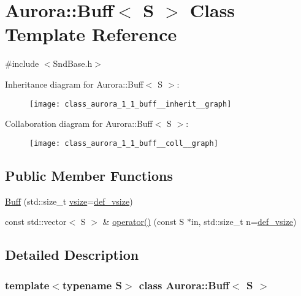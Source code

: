 \hypertarget{class_aurora_1_1_buff}{}\section{Aurora\+:\+:Buff$<$ S $>$ Class Template Reference}
\label{class_aurora_1_1_buff}


{\ttfamily \#include $<$Snd\+Base.\+h$>$}



Inheritance diagram for Aurora\+:\+:Buff$<$ S $>$\+:\nopagebreak
\begin{figure}[H]
\begin{center}
\leavevmode
\texttt{[image: class\_aurora\_1\_1\_buff\_\_inherit\_\_graph]}
\end{center}
\end{figure}


Collaboration diagram for Aurora\+:\+:Buff$<$ S $>$\+:\nopagebreak
\begin{figure}[H]
\begin{center}
\leavevmode
\texttt{[image: class\_aurora\_1\_1\_buff\_\_coll\_\_graph]}
\end{center}
\end{figure}
\subsection*{Public Member Functions}
\begin{DoxyCompactItemize}
\item 
\hyperlink{class_aurora_1_1_buff_aa6a1980c02f6f9e416bbc59905e847ad}{Buff} (std\+::size\+\_\+t \hyperlink{class_aurora_1_1_snd_base_af9e21aaf411b17f7a8221c991ce5d291}{vsize}=\hyperlink{namespace_aurora_afaaddf667a06e7ce23c667a8b7295263}{def\+\_\+vsize})
\item 
const std\+::vector$<$ S $>$ \& \hyperlink{class_aurora_1_1_buff_afd7878cb1948f8d41dfd635c163d1c27}{operator()} (const S $\ast$in, std\+::size\+\_\+t n=\hyperlink{namespace_aurora_afaaddf667a06e7ce23c667a8b7295263}{def\+\_\+vsize})
\end{DoxyCompactItemize}


\subsection{Detailed Description}
\subsubsection*{template$<$typename S$>$\newline
class Aurora\+::\+Buff$<$ S $>$}

